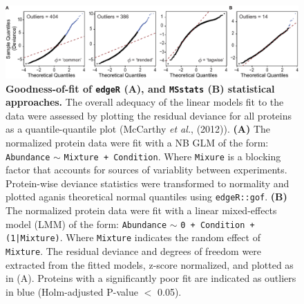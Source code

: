 \documentclass[11pt]{elife}\usepackage[]{graphicx}\usepackage[]{color}
\begin{document}
\begin{fullwidth}

\begin{figure}[ht]
	\begin{fullwidth}
		\begin{center}
		\includegraphics[width=0.9\paperwidth,keepaspectratio]{gof}
		\caption{\textbf{Goodness-of-fit of \texttt{edgeR} (A), and 
		\texttt{MSstats} (B) statistical approaches.} The overall
		adequacy of the linear models fit to the data were assessed 
		by plotting the residual deviance for all proteins as a 
		quantile-quantile plot (McCarthy \textit{et al.}, (2012)). 
		\textbf{(A)} The normalized
		protein data were fit with a NB GLM of the form: 
		\texttt{Abundance} $\sim$ \texttt{Mixture + Condition}.
		Where \texttt{Mixure} is a blocking factor that accounts for
		sources of variablity between experiments. Protein-wise deviance
		statistics were transformed to normality and plotted aganis
		theoretical normal quantiles using \texttt{edgeR::gof}.
		\textbf{(B)}
		The normalized protein data were fit with a linear mixed-effects 
		model (LMM) of the form: 
		\texttt{Abundance} $\sim$ \texttt{0 + Condition + (1|Mixture)}. 
		Where \texttt{Mixture} indicates the random effect
		of \texttt{Mixture}. The residual deviance and degrees of 
		freedom were extracted from the fitted models, z-score
		normalized, and plotted as in (A). Proteins with a significantly 
		poor fit are indicated as outliers in blue 
		(Holm-adjusted P-value $<$ 0.05).}
		\label{fig:gof}
	\end{center}
	\end{fullwidth}
\end{figure}


\end{fullwidth}
\end{document}
